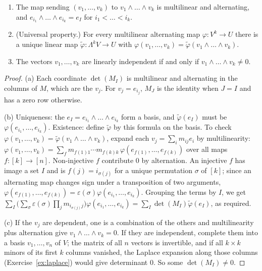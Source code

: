 \begin{theorem}\label{thm:exterior}
\begin{enumerate}[label=(\alph*)]
\item The map sending $(v_1,\dots,v_k)$ to $v_1\wedge\dots\wedge v_k$ is multilinear and alternating, and
$e_{i_1}\wedge\dots\wedge e_{i_k}=e_I$ for $i_1<\dots<i_k$.
\item (Universal property.) For every multilinear alternating map $\varphi:V^k\to U$ there is a unique linear map
$\tilde\varphi:\Lambda^kV\to U$ with $\varphi(v_1,\dots,v_k)=\tilde\varphi(v_1\wedge\dots\wedge v_k)$.
\item The vectors $v_1,\dots,v_k$ are linearly independent if and only if $v_1\wedge\dots\wedge v_k\ne0$.
\end{enumerate}
\end{theorem}
\begin{proof}
(a) Each coordinate $\det(M_I)$ is multilinear and alternating in the columns of $M$, which are the $v_j$. For
$v_j=e_{i_j}$, $M_J$ is the identity when $J=I$ and has a zero row otherwise.

(b) Uniqueness: the $e_I=e_{i_1}\wedge\dots\wedge e_{i_k}$ form a basis, and $\tilde\varphi(e_I)$ must be
$\varphi(e_{i_1},\dots,e_{i_k})$. Existence: define $\tilde\varphi$ by this formula on the basis. To check
$\varphi(v_1,\dots,v_k)=\tilde\varphi(v_1\wedge\dots\wedge v_k)$, expand each $v_j=\sum_im_{ij}e_i$ by multilinearity:
$\varphi(v_1,\dots,v_k)=\sum_fm_{f(1)1}\cdots m_{f(k)k}\,\varphi(e_{f(1)},\dots,e_{f(k)})$ over all maps
$f:[k]\to[n]$. Non-injective $f$ contribute $0$ by alternation. An injective $f$ has image a set $I$ and is
$f(j)=i_{\sigma(j)}$ for a unique permutation $\sigma$ of $[k]$; since an alternating map changes sign under a
transposition of two arguments, $\varphi(e_{f(1)},\dots,e_{f(k)})=\varepsilon(\sigma)\varphi(e_{i_1},\dots,e_{i_k})$. Grouping the
terms by $I$, we get $\sum_I\bigl(\sum_\sigma\varepsilon(\sigma)\prod_jm_{i_{\sigma(j)}j}\bigr)\varphi(e_{i_1},\dots,e_{i_k})=\sum_I\det(M_I)\tilde\varphi(e_I)$,
as required.

(c) If the $v_j$ are dependent, one is a combination of the others and multilinearity plus alternation give
$v_1\wedge\dots\wedge v_k=0$. If they are independent, complete them into a basis $v_1,\dots,v_n$ of $V$; the matrix of all
$n$ vectors is invertible, and if all $k\times k$ minors of its first $k$ columns vanished, the Laplace expansion along
those columns (Exercise~\ref{ex:laplace}) would give determinant $0$. So some $\det(M_I)\ne0$.
\end{proof}


